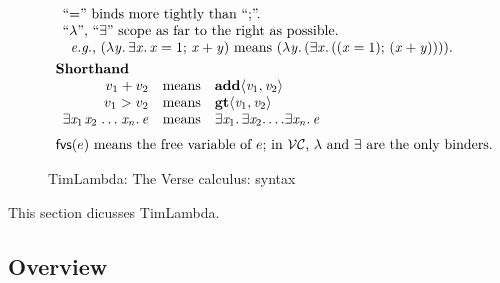 \documentclass[acmsmall,review,dvipsnames]{acmart}
\newcommand{\Varid}[1]{\mathit{#1}}
\renewcommand{\geq}{\geqslant}
\newcommand{\eg}{\emph{e.g.}}
\newcommand{\versecalc}{$\mathcal{VC}$}
\newcommand{\freevars}[1]{\mathsf{fvs}(#1)}
\newcommand{\disjoint}{\;\#\;}
\begin{document}
\begin{figure}
$$\begin{array}{l}
\begin{array}[t]{l}
          \text{``\ensuremath{\mathrel{=}}'' binds more tightly than ``;''.} \\
          \text{``$\lambda$'', ``\ensuremath{\exists{}}'' scope as far to the right as possible.} \\
          \hspace{2mm} \text{{\eg}, \ensuremath{(\lambda\Varid{y}.\,\exists\Varid{x}.\,\Varid{x}\mathrel{=}\mathrm{1};\,\Varid{x}\mathbin{+}\Varid{y})} means \ensuremath{(\lambda\Varid{y}.\,(\exists\Varid{x}.\,((\Varid{x}\mathrel{=}\mathrm{1});\,(\Varid{x}\mathbin{+}\Varid{y}))))}.}
    \end{array} \\ \\[-3mm]
    \textbf{Shorthand} \\
    \begin{array}{rcl}
      v_1 + v_2 & \text{means} & \ensuremath{\textbf{add}\langle\Varid{v}_{\mathrm{1}},\Varid{v}_{\mathrm{2}}\rangle} \\
      v_1 > v_2 & \text{means} & \ensuremath{\textbf{gt}\langle\Varid{v}_{\mathrm{1}},\Varid{v}_{\mathrm{2}}\rangle} \\
      \ensuremath{\exists\Varid{x}_{\mathrm{1}}\hspace{0.1em}\Varid{x}_{\mathrm{2}}\;\!\ldots\!\;\Varid{x}_{\Varid{n}}.\,\Varid{e}} & \text{means} & \ensuremath{\exists\Varid{x}_{\mathrm{1}}.\,\exists\Varid{x}_{\mathrm{2}}.\,\!\ldots\! \exists\Varid{x}_{\Varid{n}}.\,\Varid{e}} \\
     \end{array} \\
  \\[-2mm]
  \text{$\freevars{e}$ means the free variable of $e$; in \versecalc{}, $\lambda$ and \ensuremath{\exists{}} are the only binders.}
  \end{array}
  $$
\caption{TimLambda: The Verse calculus: syntax} \label{fig:tim-syntax}
\end{figure}

This section dicusses TimLambda.

\subsection{Overview}
\end{document}
